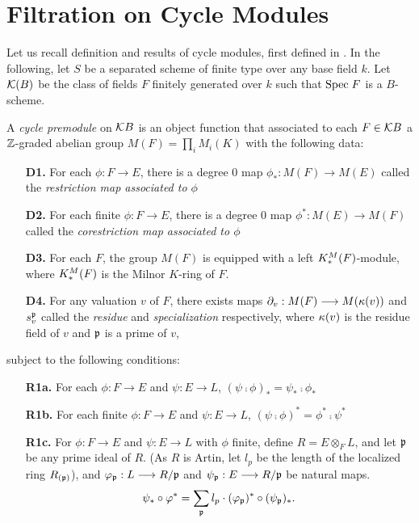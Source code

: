 \section{Filtration on Cycle Modules}

Let us recall definition and results of cycle modules, first
defined in \cite{Ro96}. In the following, let $S$ be a separated 
scheme of finite type over any base field $k$. Let $\mathcal{K}(B)$ 
be the class of fields $F$ finitely generated over $k$ such that
$\mathrm{Spec}\; F$ is a $B$-scheme.

\begin{definition}
A \emph{cycle premodule} on $\mathcal{K}{B}$ is an object function
that associated to each $F \in \mathcal{K}{B}$ a $\mathbb{Z}$-graded abelian
group $M(F) = \prod_i M_i(K)$ with the following data:

\begin{enumerate}
\item[\textbf{D1.}] For each $\phi: F \to E$, there is a degree 0
map $\phi_*: M(F) \to M(E)$ called the \emph{restriction map 
associated to $\phi$}

\item[\textbf{D2.}] For each finite $\phi: F \to E$, there is a 
degree 0 map $\phi^*: M(E) \to M(F)$ called the \emph{corestriction
map associated to $\phi$}

\item[\textbf{D3.}] For each $F$, the group $M(F)$ is equipped
with a left $K^M_*(F)$-module, where $K^M_*(F)$ is the Milnor
$K$-ring of $F$.

\item[\textbf{D4.}] For any valuation $v$ of $F$, there exists 
maps $\partial_{v}: M(F) \longrightarrow M(\kappa{(}v))$ and $s_{v}^{\mathfrak{p}}$
called the \emph{residue} and \emph{specialization} respectively, 
where $\kappa{(}v)$ is the residue field of $v$ and $\mathfrak{p}$ is 
a prime of $v$,
\end{enumerate}

subject to the following conditions:

\begin{enumerate}
\item[\textbf{R1a.}] For each $\phi: F \to E$ and $\psi: E \to L$,
$(\psi \comp \phi)_* = \psi_* \comp \phi_*$

\item[\textbf{R1b.}] For each finite $\phi: F \to E$ and $\psi: E
\to L$, $(\psi \comp \phi)^* = \phi^* \comp \psi^*$

\item[\textbf{R1c.}] For $\phi: F \to E$ and $\psi: E \to L$ with
$\phi$ finite, define $R = E \otimes_F L$, and let $\mathfrak{p}$
be any prime ideal of $R$. (As $R$ is Artin, let $l_p$ be the 
length of the localized ring $R_{(\mathfrak{p})}$), and 
$\varphi_{\mathfrak{p}}: L \longrightarrow R/{\mathfrak{p}}$ and 
$\psi_{\mathfrak{p}}: E \longrightarrow R/{\mathfrak{p}}$ be natural maps.
\[
\psi_*\circ \varphi^* = \sum_{\mathfrak{p}} l_p \cdot 
(\varphi_{\mathfrak{p}})^* \circ (\psi_{\mathfrak{p}})_*.
\]


\end{enumerate}
\end{definition}
